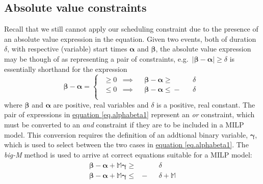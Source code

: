 \subsection{Absolute value constraints}\label{SS.absval}
Recall that we still cannot apply our scheduling constraint due to the presence
of an absolute value expression in the equation.
Given two events, both of duration $\delta$, with respective (variable) start
times $\boldsymbol{\alpha}$ and $\boldsymbol{\beta}$, the absolute
value expression may be though of as representing a pair of constraints, e.g.\ 
$ \lvert \boldsymbol{\beta} - \boldsymbol{\alpha} \rvert \ge \delta $
is essentially shorthand for the expression
\begin{equation}
    \boldsymbol{\beta} - \boldsymbol{\alpha} = 
    \begin{cases}
        \begin{alignedat}{6}
            \ge{} 0 &\implies &&\boldsymbol{\beta} {}-{} \boldsymbol{\alpha}
            {}\ge{} &&\delta\\
            \le{} 0 &\implies &&\boldsymbol{\beta} {}-{} \boldsymbol{\alpha}
            {}\le{} - &&\delta\\
        \end{alignedat}
    \end{cases}
    \label{eq.alphabeta1}
\end{equation}
where $\boldsymbol{\beta}$ and $\boldsymbol{\alpha}$ are positive, real
variables and $\delta$ is a positive, real constant.
The pair of expressions in 
\hyperref[eq.alphabeta1]{equation \ref*{eq.alphabeta1}}
represent an \emph{or} constraint, which must be converted to an \emph{and}
constraint if they are to be included in a MILP model.
This conversion requires the definition of an addtional binary variable,
$\boldsymbol{\gamma}$, which is used to select between the two cases in
\hyperref[eq.alphabeta1]{equation \ref*{eq.alphabeta1}}.
The \emph{big-M} method is used to arrive at correct equations suitable for a
MILP model:
\begin{equation}
    \begin{split}
        \begin{alignedat}{4}
            \boldsymbol{\beta} - \boldsymbol{\alpha} + \mathbb{M} 
            \boldsymbol{\gamma} {}\ge{} & &&\delta\\
            \boldsymbol{\beta} - \boldsymbol{\alpha} + \mathbb{M}
            \boldsymbol{\gamma} {}\le{} & - &&\delta {}+{} \mathbb{M}\\
        \end{alignedat}
    \end{split}
    \label{eq.alphabeta2}
\end{equation}
